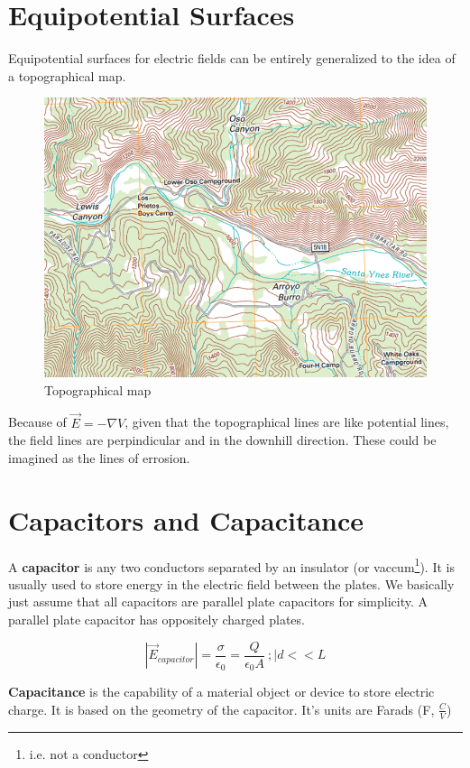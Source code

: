 \documentclass[10pt, a4paper, twocolumn]{article}
\begin{document}
    \section{Equipotential Surfaces}	
        Equipotential surfaces for electric fields can be entirely generalized to the idea of a topographical map.
        \begin{figure}[H]
            \includegraphics[width=\linewidth]{topo-map} %
            \caption{Topographical map} %
        \end{figure}

        Because of $\vec{E} = -\nabla V$, given that the topographical lines are like potential lines, the field lines are perpindicular and in the downhill direction. These could be imagined as the lines of errosion. 

    \section{Capacitors and Capacitance}	
    A \textbf{capacitor} is any two conductors separated by an insulator (or vaccum\footnote{i.e. not a conductor}). It is usually used to store energy in the electric field between the plates. We basically just assume that all capacitors are parallel plate capacitors for simplicity. A parallel plate capacitor has oppositely charged plates.

    $$|\vec{E}_{capacitor}| = \frac{\sigma}{\epsilon_0} = \frac{Q}{\epsilon_0 A}\ ; | d << L$$

    \textbf{Capacitance} is the capability of a material object or device to store electric charge. It is based on the geometry of the capacitor. It's units are Farads (F, $\frac{C}{V}$)
\end{document}
